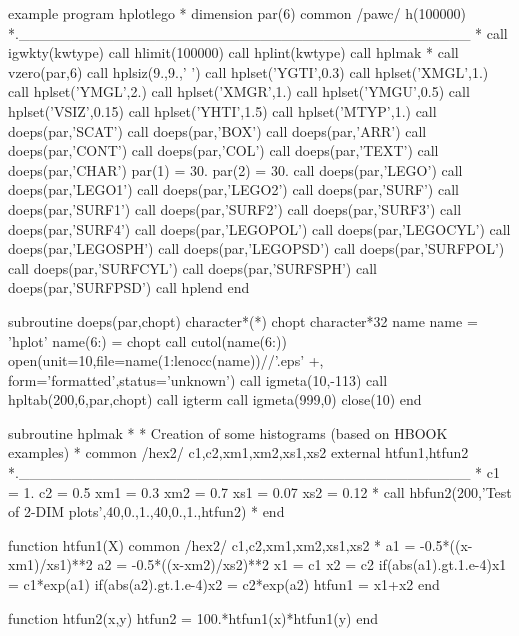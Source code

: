 \begin{XMPt}{ example}
      program hplotlego
*
      dimension par(6)
      common /pawc/ h(100000)
*.___________________________________________
*
      call igwkty(kwtype)
      call hlimit(100000)
      call hplint(kwtype)
      call hplmak
*
      call vzero(par,6)
      call hplsiz(9.,9.,' ')
      call hplset('YGTI',0.3)
      call hplset('XMGL',1.)
      call hplset('YMGL',2.)
      call hplset('XMGR',1.)
      call hplset('YMGU',0.5)
      call hplset('VSIZ',0.15)
      call hplset('YHTI',1.5)
      call hplset('MTYP',1.)
      call doeps(par,'SCAT')
      call doeps(par,'BOX')
      call doeps(par,'ARR')
      call doeps(par,'CONT')
      call doeps(par,'COL')
      call doeps(par,'TEXT')
      call doeps(par,'CHAR')
      par(1) = 30.
      par(2) = 30.
      call doeps(par,'LEGO')
      call doeps(par,'LEGO1')
      call doeps(par,'LEGO2')
      call doeps(par,'SURF')
      call doeps(par,'SURF1')
      call doeps(par,'SURF2')
      call doeps(par,'SURF3')
      call doeps(par,'SURF4')
      call doeps(par,'LEGOPOL')
      call doeps(par,'LEGOCYL')
      call doeps(par,'LEGOSPH')
      call doeps(par,'LEGOPSD')
      call doeps(par,'SURFPOL')
      call doeps(par,'SURFCYL')
      call doeps(par,'SURFSPH')
      call doeps(par,'SURFPSD')
      call hplend
      end

      subroutine doeps(par,chopt)
      character*(*) chopt
      character*32 name
      name     = 'hplot'
      name(6:) = chopt
      call cutol(name(6:))
      open(unit=10,file=name(1:lenocc(name))//'.eps'
     +,    form='formatted',status='unknown')
      call igmeta(10,-113)
      call hpltab(200,6,par,chopt)
      call igterm
      call igmeta(999,0)
      close(10)
      end

      subroutine hplmak
*
*  Creation of some histograms (based on HBOOK examples)
*
      common /hex2/ c1,c2,xm1,xm2,xs1,xs2
      external htfun1,htfun2
*.___________________________________________
*
      c1  = 1.
      c2  = 0.5
      xm1 = 0.3
      xm2 = 0.7
      xs1 = 0.07
      xs2 = 0.12
*
      call hbfun2(200,'Test of 2-DIM plots',40,0.,1.,40,0.,1.,htfun2)
*
      end

      function htfun1(X)
      common /hex2/ c1,c2,xm1,xm2,xs1,xs2
*
      a1 = -0.5*((x-xm1)/xs1)**2
      a2 = -0.5*((x-xm2)/xs2)**2
      x1 = c1
      x2 = c2
      if(abs(a1).gt.1.e-4)x1 = c1*exp(a1)
      if(abs(a2).gt.1.e-4)x2 = c2*exp(a2)
      htfun1 = x1+x2
      end

      function htfun2(x,y)
      htfun2 = 100.*htfun1(x)*htfun1(y)
      end
\end{XMPt}

